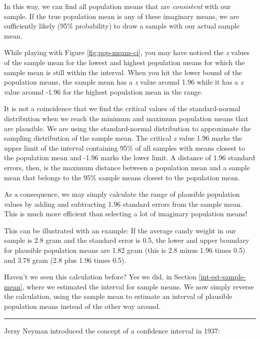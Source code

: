 \documentclass[a4paper]{book}
\theoremstyle{definition}
\theoremstyle{definition}
\theoremstyle{definition}
\theoremstyle{remark}
\begin{document}
In this way, we can find all population means that are \emph{consistent}
with our sample. If the true population mean is any of these imaginary
means, we are sufficiently likely (95\% probability) to draw a sample
with our actual sample mean.

While playing with Figure \ref{fig:pop-means-ci}, you may have noticed
the \emph{z} values of the sample mean for the lowest and highest
population means for which the sample mean is still within the interval.
When you hit the lower bound of the population means, the sample mean
has a \emph{z} value around 1.96 while it has a \emph{z} value around
-1.96 for the highest population mean in the range.

It is not a coincidence that we find the critical values of the
standard-normal distribution when we reach the minimum and maximum
population means that are plausible. We are using the standard-normal
distribution to approximate the sampling distribution of the sample
mean. The critical \emph{z} value 1.96 marks the upper limit of the
interval containing 95\% of all samples with means closest to the
population mean and -1.96 marks the lower limit. A distance of 1.96
standard errors, then, is the maximum distance between a population mean
and a sample mean that belongs to the 95\% sample means closest to the
population mean.

As a consequence, we may simply calculate the range of plausible
population values by adding and subtracting 1.96 standard errors from
the sample mean. This is much more efficient than selecting a lot of
imaginary population means!

This can be illustrated with an example: If the average candy weight in
our sample is 2.8 gram and the standard error is 0.5, the lower and
upper boundary for plausible population means are 1.82 gram (this is 2.8
minus 1.96 times 0.5) and 3.78 gram (2.8 plus 1.96 times 0.5).

Haven't we seen this calculation before? Yes we did, in Section
\ref{int-est-sample-mean}, where we estimated the interval for sample
means. We now simply reverse the calculation, using the sample mean to
estimate an interval of plausible population means instead of the other
way around.

\begin{center}\rule{0.5\linewidth}{\linethickness}\end{center}

Jerzy Neyman introduced the concept of a confidence interval in 1937:
\end{document}
